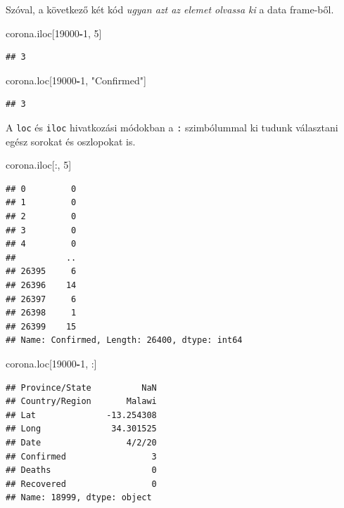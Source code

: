 \documentclass[
]{book}
\newenvironment{Shaded}{\begin{snugshade}}{\end{snugshade}}
\newcommand{\DecValTok}[1]{\textcolor[rgb]{0.00,0.00,0.81}{#1}}
\newcommand{\NormalTok}[1]{#1}
\newcommand{\OperatorTok}[1]{\textcolor[rgb]{0.81,0.36,0.00}{\textbf{#1}}}
\newcommand{\StringTok}[1]{\textcolor[rgb]{0.31,0.60,0.02}{#1}}
\begin{document}
Szóval, a következő két kód \emph{ugyan azt az elemet olvassa ki} a data frame-ből.

\begin{Shaded}
\begin{Highlighting}[]
\NormalTok{corona.iloc[}\DecValTok{19000}\OperatorTok{{-}}\DecValTok{1}\NormalTok{, }\DecValTok{5}\NormalTok{]}
\end{Highlighting}
\end{Shaded}

\begin{verbatim}
## 3
\end{verbatim}

\begin{Shaded}
\begin{Highlighting}[]
\NormalTok{corona.loc[}\DecValTok{19000}\OperatorTok{{-}}\DecValTok{1}\NormalTok{, }\StringTok{"Confirmed"}\NormalTok{]}
\end{Highlighting}
\end{Shaded}

\begin{verbatim}
## 3
\end{verbatim}

A \texttt{loc} és \texttt{iloc} hivatkozási módokban a \texttt{:} szimbólummal ki tudunk választani egész sorokat és oszlopokat is.

\begin{Shaded}
\begin{Highlighting}[]
\NormalTok{corona.iloc[:, }\DecValTok{5}\NormalTok{]}
\end{Highlighting}
\end{Shaded}

\begin{verbatim}
## 0         0
## 1         0
## 2         0
## 3         0
## 4         0
##          ..
## 26395     6
## 26396    14
## 26397     6
## 26398     1
## 26399    15
## Name: Confirmed, Length: 26400, dtype: int64
\end{verbatim}

\begin{Shaded}
\begin{Highlighting}[]
\NormalTok{corona.loc[}\DecValTok{19000}\OperatorTok{{-}}\DecValTok{1}\NormalTok{, :]}
\end{Highlighting}
\end{Shaded}

\begin{verbatim}
## Province/State          NaN
## Country/Region       Malawi
## Lat              -13.254308
## Long              34.301525
## Date                 4/2/20
## Confirmed                 3
## Deaths                    0
## Recovered                 0
## Name: 18999, dtype: object
\end{verbatim}
\end{document}
